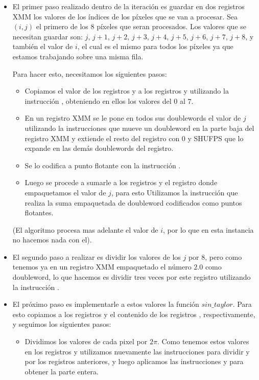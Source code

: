 \begin{itemize}
  \item El primer paso realizado dentro de la iteración es guardar en dos registros XMM los valores de los índices de los píxeles que se van a procesar. Sea $(i,j)$ el primero de los $8$ píxeles que seran procesados. Los valores que se necesitan guardar son: $j$, $j+1$, $j+2$, $j+3$, $j+4$, $j+5$, $j+6$, $j+7$, $j+8$, y también el valor de $i$, el cual es el mismo para todos los píxeles ya que estamos trabajando sobre una misma fila.
  
  Para hacer esto, necesitamos los siguientes pasos:
  \begin{itemize}
    \item Copiamos el valor de los registros  y  a los registros  y  utilizando la instrucción , obteniendo en ellos los valores del $0$ al $7$.
    \item En un registro XMM se le pone en todos sus doublewords el valor de $j$ utilizando la instrucciones  que mueve un doubleword en la parte baja del registro XMM y extiende el resto del registro con $0$ y SHUFPS que lo expande en las demás doublewords del registro. 
    \item Se lo codifica a punto flotante con la instrucción . 
    \item Luego se procede a sumarle a los registros  y  el registro donde empaquetamos el valor de $j$, para esto Utilizamos la instrucción  que realiza la suma empaquetada de doubleword codificados como puntos flotantes.
  \end{itemize}
  
  (El algoritmo procesa mas adelante el valor de $i$, por lo que en esta instancia no hacemos nada con el).

  \item El segundo paso a realizar es dividir los valores de los $j$ por $8$, pero como tenemos ya en un registro XMM empaquetado el número $2.0$ como doubleword, lo que hacemos es dividir tres veces por este registro utilizando la instrucción .

  \item  El próximo paso es implementarle a estos valores la función $sin\_taylor$. Para esto copiamos a los registros  y  el contenido de los registros , respectivamente, y seguimos los siguientes pasos:

  \begin{itemize}
    \item Dividimos los valores de cada pixel por $2\pi$. Como tenemos estos valores en los registros  y  utilizamos nuevamente las instrucciones  para dividir  y  por los registros anteriores, y luego aplicamos las instrucciones  y  para obtener la parte entera.


\end{itemize}
\end{itemize}
